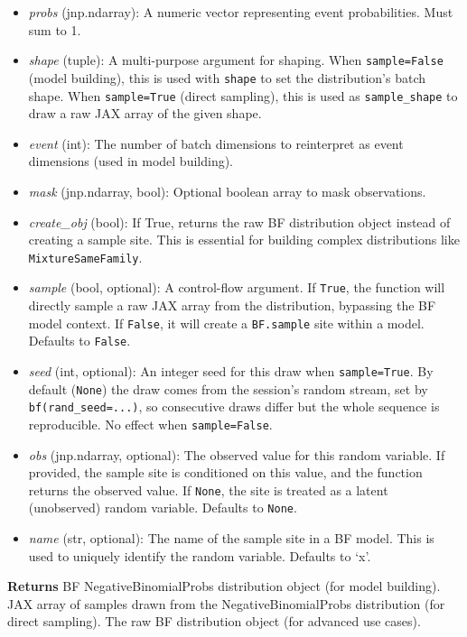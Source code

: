 \documentclass[
  letterpaper,
  DIV=11,
  numbers=noendperiod]{scrartcl}
\begin{document}
\begin{itemize}
\item
  \emph{probs} (jnp.ndarray): A numeric vector representing event
  probabilities. Must sum to 1.
\item
  \emph{shape} (tuple): A multi-purpose argument for shaping. When
  \texttt{sample=False} (model building), this is used with
  \texttt{shape} to set the distribution's batch shape. When
  \texttt{sample=True} (direct sampling), this is used as
  \texttt{sample\_shape} to draw a raw JAX array of the given shape.
\item
  \emph{event} (int): The number of batch dimensions to reinterpret as
  event dimensions (used in model building).
\item
  \emph{mask} (jnp.ndarray, bool): Optional boolean array to mask
  observations.
\item
  \emph{create\_obj} (bool): If True, returns the raw BF distribution
  object instead of creating a sample site. This is essential for
  building complex distributions like \texttt{MixtureSameFamily}.
\item
  \emph{sample} (bool, optional): A control-flow argument. If
  \texttt{True}, the function will directly sample a raw JAX array from
  the distribution, bypassing the BF model context. If \texttt{False},
  it will create a \texttt{BF.sample} site within a model. Defaults to
  \texttt{False}.
\item
  \emph{seed} (int, optional): An integer seed for this draw when
  \texttt{sample=True}. By default (\texttt{None}) the draw comes from
  the session's random stream, set by \texttt{bf(rand\_seed=...)}, so
  consecutive draws differ but the whole sequence is reproducible. No
  effect when \texttt{sample=False}.
\item
  \emph{obs} (jnp.ndarray, optional): The observed value for this random
  variable. If provided, the sample site is conditioned on this value,
  and the function returns the observed value. If \texttt{None}, the
  site is treated as a latent (unobserved) random variable. Defaults to
  \texttt{None}.
\item
  \emph{name} (str, optional): The name of the sample site in a BF
  model. This is used to uniquely identify the random variable. Defaults
  to `x'.
\end{itemize}

\textbf{Returns} BF NegativeBinomialProbs distribution object (for model
building). JAX array of samples drawn from the NegativeBinomialProbs
distribution (for direct sampling). The raw BF distribution object (for
advanced use cases).
\end{document}
